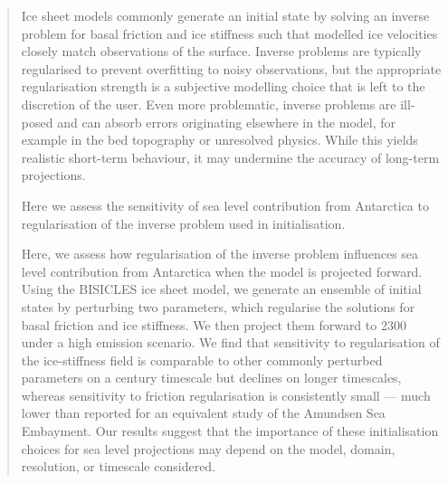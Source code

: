 \documentclass[journal abbreviation, manuscript]{copernicus}
\begin{document}
\begin{abstract}
Ice sheet models commonly generate an initial state by solving an inverse problem for basal friction and ice stiffness such that modelled ice velocities closely match observations of the surface. Inverse problems are typically regularised to prevent overfitting to noisy observations, but the appropriate regularisation strength is a subjective modelling choice that is left to the discretion of the user. Even more problematic, inverse problems are ill-posed and can absorb errors originating elsewhere in the model, for example in the bed topography or unresolved physics. While this yields realistic short-term behaviour, it may undermine the accuracy of long-term projections. 

Here we assess the sensitivity of sea level contribution from Antarctica to regularisation of the inverse problem used in initialisation.

Here, we assess how regularisation of the inverse problem influences sea level contribution from Antarctica when the model is projected forward. Using the BISICLES ice sheet model, we generate an ensemble of initial states by perturbing two parameters, which regularise the solutions for basal friction and ice stiffness. We then project them forward to 2300 under a high emission scenario. We find that sensitivity to regularisation of the ice-stiffness field is comparable to other commonly perturbed parameters on a century timescale but declines on longer timescales, whereas sensitivity to friction regularisation is consistently small — much lower than reported for an equivalent study of the Amundsen Sea Embayment. Our results suggest that the importance of these initialisation choices for sea level projections may depend on the model, domain, resolution, or timescale considered.

\end{abstract}




\introduction%
\end{document}
